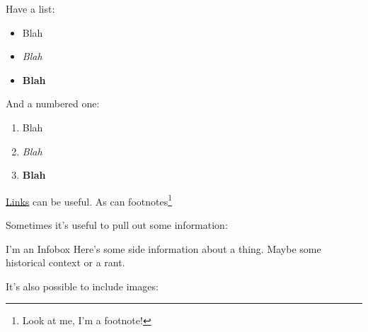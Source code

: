 \hr

Have a list:

\begin{itemize}
    \item Blah
    \item \textit{Blah}
    \item \textbf{Blah}
\end{itemize}

And a numbered one:

\begin{enumerate}
    \item Blah
    \item \textit{Blah}
    \item \textbf{Blah}
\end{enumerate}

\href{https://duckduckgo.com}{Links} can be useful. As can footnotes\footnote{Look at me, I'm a footnote!}
\\

\pagebreak

Sometimes it's useful to pull out some information:

\begin{infobox}{I'm an Infobox}
    Here's some side information about a thing. Maybe some historical context or a rant.
\end{infobox}


It's also possible to include images:

